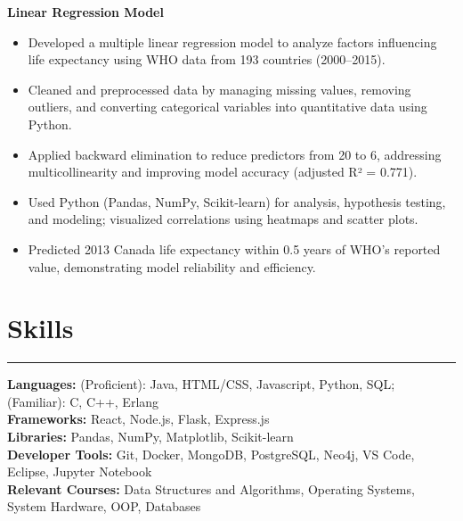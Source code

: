\documentclass[10pt]{article}
\begin{document}
\textbf{Linear Regression Model} 
\vspace{-4mm}
\begin{itemize}[left=0.15in, itemsep=0pt]
    \item Developed a multiple linear regression model to analyze factors influencing life expectancy using WHO data from 193 countries (2000–2015).
    \item Cleaned and preprocessed data by managing missing values, removing outliers, and converting categorical variables into quantitative data using Python.
    \item Applied backward elimination to reduce predictors from 20 to 6, addressing multicollinearity and improving model accuracy (adjusted R² = 0.771).
    \item Used Python (Pandas, NumPy, Scikit-learn) for analysis, hypothesis testing, and modeling; visualized correlations using heatmaps and scatter plots.
    \item Predicted 2013 Canada life expectancy within 0.5 years of WHO’s reported value, demonstrating model reliability and efficiency.
\end{itemize}

\section*{Skills}
\vspace{-2mm}
\hrule
\vspace{0mm}
\textbf{Languages:} (Proficient): Java, HTML/CSS, Javascript, Python, SQL; (Familiar): C, C++, Erlang \\
\textbf{Frameworks:} React, Node.js, Flask, Express.js  \\
\textbf{Libraries:} Pandas, NumPy, Matplotlib, Scikit-learn \\
\textbf{Developer Tools:} Git, Docker, MongoDB, PostgreSQL, Neo4j, VS Code, Eclipse, Jupyter Notebook \\
\textbf{Relevant Courses:} Data Structures and Algorithms, Operating Systems, System Hardware, OOP, Databases
\end{document}
